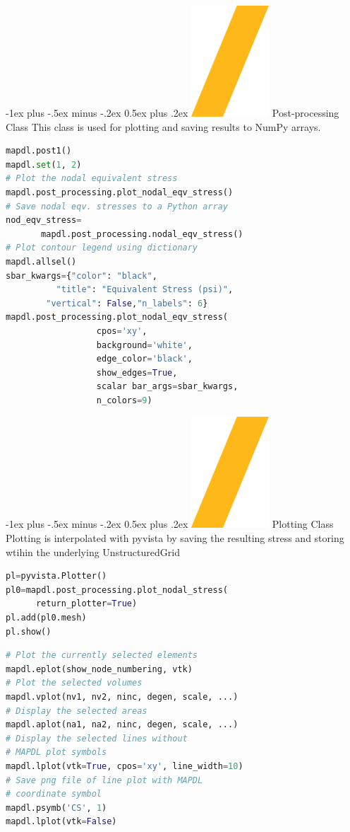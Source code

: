 \documentclass[9pt,landscape]{article}
\makeatletter
\renewcommand{\section}{\@startsection{section}{1}{0mm}%
                                {-1ex plus -.5ex minus -.2ex}%
                                {0.5ex plus .2ex}%
                                {\normalfont\large\bfseries}}
\def\code#1{\texttt{#1}}
\makeatother
\begin{document}
\begin{multicols}{3}
\columnbreak

\section{\includegraphics[height=\fontcharht\font`\S]{slash.png} Post-processing Class}
This class is used for plotting and saving results to NumPy arrays.
\begin{lstlisting}[language=Python]
mapdl.post1()
mapdl.set(1, 2)
# Plot the nodal equivalent stress
mapdl.post_processing.plot_nodal_eqv_stress()
# Save nodal eqv. stresses to a Python array
nod_eqv_stress=
       mapdl.post_processing.nodal_eqv_stress()
# Plot contour legend using dictionary
mapdl.allsel()
sbar_kwargs={"color": "black",
          "title": "Equivalent Stress (psi)",
        "vertical": False,"n_labels": 6}
mapdl.post_processing.plot_nodal_eqv_stress(
                  cpos='xy',
                  background='white',
                  edge_color='black',
                  show_edges=True,
                  scalar bar_args=sbar_kwargs,
                  n_colors=9)
\end{lstlisting} 
\vfill
\section{\includegraphics[height=\fontcharht\font`\S]{slash.png} Plotting Class}
Plotting is interpolated with pyvista by saving the resulting stress and storing wtihin the underlying UnstructuredGrid
\begin{lstlisting}[language=Python]
pl=pyvista.Plotter()
pl0=mapdl.post_processing.plot_nodal_stress(
      return_plotter=True)
pl.add(pl0.mesh)
pl.show()
\end{lstlisting} 
\begin{lstlisting}[language=Python]
# Plot the currently selected elements
mapdl.eplot(show_node_numbering, vtk)
# Plot the selected volumes
mapdl.vplot(nv1, nv2, ninc, degen, scale, ...)
# Display the selected areas
mapdl.aplot(na1, na2, ninc, degen, scale, ...)
# Display the selected lines without 
# MAPDL plot symbols
mapdl.lplot(vtk=True, cpos='xy', line_width=10)
# Save png file of line plot with MAPDL 
# coordinate symbol
mapdl.psymb('CS', 1)
mapdl.lplot(vtk=False)
\end{lstlisting} 
\vfill


\end{multicols}
\end{document}
